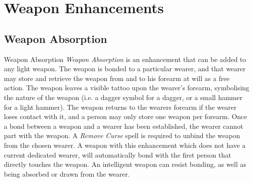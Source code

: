\section{Weapon Enhancements}

\subsection{Weapon Absorption}
\label{sec:Weapon Absorption}

\begin{35e}{Weapon Absorption}
  \emph{Weapon Absorption} is an enhancement that can be added to any light
  weapon. The weapon is bonded to a particular wearer, and that wearer may
  store and retrieve the weapon from and to his forearm at will as a free
  action. The weapon leaves a visible tattoo upon the wearer's forearm,
  symbolising the nature of the weapon (i.e. a dagger symbol for a dagger, or
  a small hammer for a light hammer). The weapon returns to the wearers
  forearm if the wearer loses contact with it, and a person may only store one
  weapon per forearm. Once a bond between a weapon and a wearer has been
  established, the wearer cannot part with the weapon. A \emph{Remove Curse}
  spell is required to unbind the weapon from the chosen wearer. A weapon
  with this enhancement which does not have a current dedicated wearer, will
  automatically bond with the first person that directly touches the weapon.
  An intelligent weapon can resist bonding, as well as being absorbed or drawn
  from the wearer.
\end{35e}
